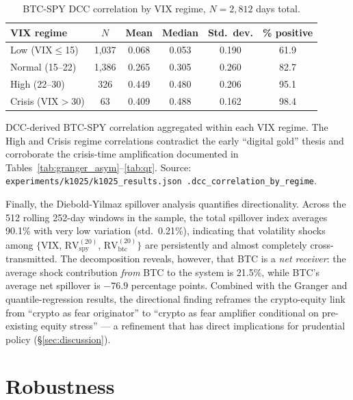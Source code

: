 \documentclass[11pt,a4paper]{article}
\begin{document}
\begin{table}[H]
\centering
\caption{BTC-SPY DCC correlation by VIX regime, $N = 2{,}812$ days total.}
\label{tab:dcc}
\begin{tabular}{lccccc}
\toprule
VIX regime    & $N$  & Mean & Median & Std.\ dev. & \% positive \\
\midrule
Low (VIX$\le$15)        & 1{,}037 & 0.068 & 0.053 & 0.190 & 61.9 \\
Normal (15--22)         & 1{,}386 & 0.265 & 0.305 & 0.260 & 82.7 \\
High (22--30)           & 326   & 0.449 & 0.480 & 0.206 & 95.1 \\
Crisis (VIX$>$30)       & 63    & 0.409 & 0.488 & 0.162 & 98.4 \\
\bottomrule
\end{tabular}
\begin{flushleft}
\footnotesize DCC-derived BTC-SPY correlation aggregated within each VIX regime. The High and Crisis regime correlations contradict the early ``digital gold'' thesis and corroborate the crisis-time amplification documented in Tables~\ref{tab:granger_asym}--\ref{tab:qr}. Source: \texttt{experiments/k1025/k1025\_results.json .dcc\_correlation\_by\_regime}.
\end{flushleft}
\end{table}

Finally, the Diebold-Yilmaz spillover analysis quantifies directionality. Across the 512 rolling 252-day windows in the sample, the total spillover index averages 90.1\% with very low variation (std.\ 0.21\%), indicating that volatility shocks among $\{$VIX, $\text{RV}^{(20)}_{\text{spy}}$, $\text{RV}^{(20)}_{\text{btc}}\}$ are persistently and almost completely cross-transmitted. The decomposition reveals, however, that BTC is a \emph{net receiver}: the average shock contribution \emph{from} BTC to the system is 21.5\%, while BTC's average net spillover is $-76.9$ percentage points.%
 Combined with the Granger and quantile-regression results, the directional finding reframes the crypto-equity link from ``crypto as fear originator'' to ``crypto as fear amplifier conditional on pre-existing equity stress'' --- a refinement that has direct implications for prudential policy (\S\ref{sec:discussion}).

\section{Robustness}
\label{sec:robustness}
\end{document}
